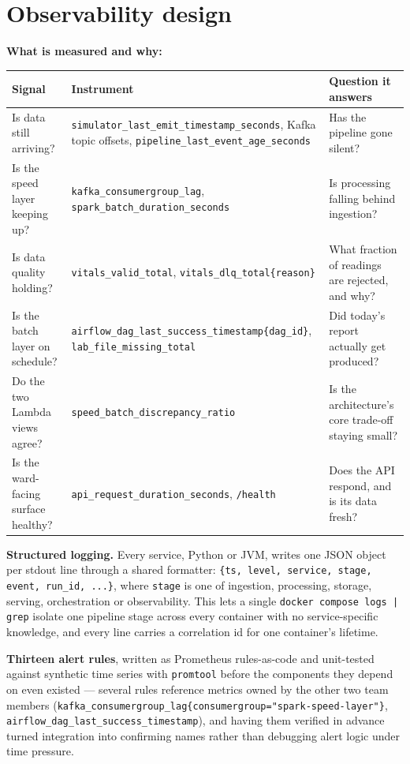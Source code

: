 \documentclass[11pt,a4paper]{article}
\newcommand{\code}[1]{\texttt{\small #1}}
\begin{document}
\section{Observability design}
\label{sec:observability}

\textbf{What is measured and why:}

\begin{longtable}{@{}L{4.3cm}L{4.8cm}L{5.4cm}@{}}
\toprule
\textbf{Signal} & \textbf{Instrument} & \textbf{Question it answers} \\
\midrule
\endhead
Is data still arriving? & \code{simulator\_last\_emit\_timestamp\_seconds}, Kafka topic offsets, \code{pipeline\_last\_event\_age\_seconds} & Has the pipeline gone silent? \\
Is the speed layer keeping up? & \code{kafka\_consumergroup\_lag}, \code{spark\_batch\_duration\_seconds} & Is processing falling behind ingestion? \\
Is data quality holding? & \code{vitals\_valid\_total}, \code{vitals\_dlq\_total\{reason\}} & What fraction of readings are rejected, and why? \\
Is the batch layer on schedule? & \code{airflow\_dag\_last\_success\_timestamp\{dag\_id\}}, \code{lab\_file\_missing\_total} & Did today's report actually get produced? \\
Do the two Lambda views agree? & \code{speed\_batch\_discrepancy\_ratio} & Is the architecture's core trade-off staying small? \\
Is the ward-facing surface healthy? & \code{api\_request\_duration\_seconds}, \code{/health} & Does the API respond, and is its data fresh? \\
\bottomrule
\end{longtable}

\textbf{Structured logging.} Every service, Python or JVM, writes one JSON object per stdout line
through a shared formatter: \code{\{ts, level, service, stage, event, run\_id, ...\}}, where
\code{stage} is one of ingestion, processing, storage, serving, orchestration or observability. This
lets a single \code{docker compose logs | grep} isolate one pipeline stage across every container
with no service-specific knowledge, and every line carries a correlation id for one container's
lifetime.

\textbf{Thirteen alert rules}, written as Prometheus rules-as-code and unit-tested against synthetic
time series with \code{promtool} before the components they depend on even existed --- several rules
reference metrics owned by the other two team members
(\code{kafka\_consumergroup\_lag\{consumergroup="spark-speed-layer"\}}, \code{airflow\_dag\_last\_success\_timestamp}),
and having them verified in advance turned integration into confirming names rather than debugging
alert logic under time pressure.
\end{document}
